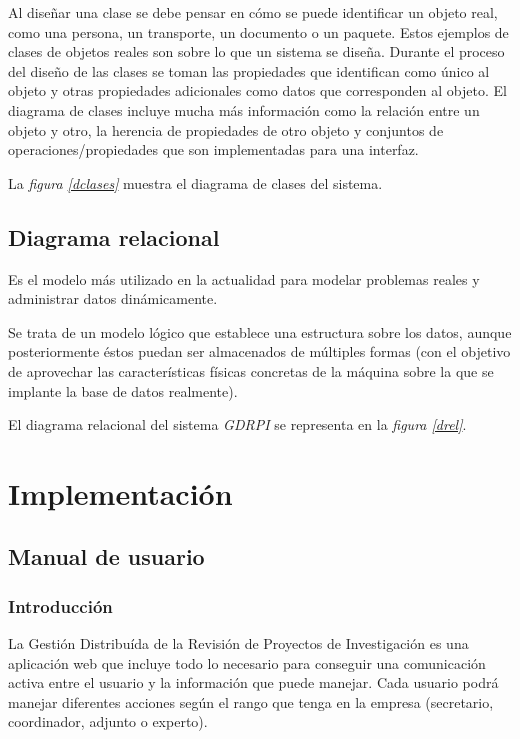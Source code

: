 \documentclass[11pt,a4paper,spanish,twoside]{book}
\begin{document}
Al diseñar una clase se debe pensar en cómo se puede identificar un objeto
real, como una persona, un transporte, un documento o un paquete. Estos
ejemplos de clases de objetos reales son sobre lo que un sistema se
diseña. Durante el proceso del diseño de las clases se toman las propiedades
que identifican como único al objeto y otras propiedades adicionales como
datos que corresponden al objeto. El diagrama de clases incluye mucha más
información como la relación entre un objeto y otro, la herencia de
propiedades de otro objeto y conjuntos de operaciones/propiedades que son
implementadas para una interfaz.

La \emph{figura \ref{dclases}} muestra el diagrama de clases del sistema.

\begin{sidewaystable}
\end{sidewaystable}

\chapter{Diagrama relacional}
Es el modelo más utilizado en la actualidad para modelar problemas reales y 
administrar datos dinámicamente.

Se trata de un modelo lógico que establece una estructura sobre los datos,
aunque posteriormente éstos puedan ser almacenados de múltiples formas (con
el objetivo de aprovechar las características físicas concretas de la máquina
sobre la que se implante la base de datos realmente).

El diagrama relacional del sistema \emph{GDRPI} se representa en la
\emph{figura \ref{drel}}.


\part{Implementación}
\chapter{Manual de usuario}
\section{Introducción}
La Gestión Distribuída de la Revisión de Proyectos de Investigación es una
aplicación web que incluye todo lo necesario para conseguir una comunicación 
activa entre el usuario y la información que puede manejar. Cada usuario podrá 
manejar diferentes acciones según el rango que tenga en la empresa (secretario,
coordinador, adjunto o experto).
\end{document}
